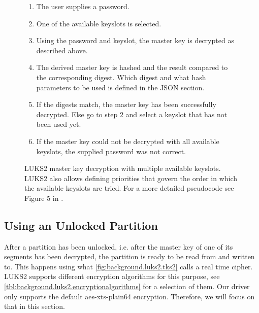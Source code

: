 \begin{figure}[htb!]
	\center
	\begin{mdframed}
		\begin{enumerate}
			\item The user supplies a password.
			\item One of the available keyslots is selected.
			\item Using the password and keyslot, the master key is decrypted as described above.
			\item The derived master key is hashed and the result compared to the corresponding digest. Which digest and what hash parameters to be used is defined in the JSON section.
			\item If the digests match, the master key has been successfully decrypted. Else go to step 2 and select a keyslot that has not been used yet.
			\item If the master key could not be decrypted with all available keyslots, the supplied password was not correct.
		\end{enumerate}
	\end{mdframed}
	\caption[
		LUKS2 master key decryption with multiple available keyslots
	]{
		LUKS2 master key decryption with multiple available keyslots. LUKS2 also allows defining priorities that govern the order in which the available keyslots are tried. For a more detailed pseudocode see Figure 5 in \cite{Fruwirth2018}.
	}
	\label{fig:background.luks2.unlocking}
\end{figure}

\subsection{Using an Unlocked Partition}
\label{chap:background.luks2.using}
After a partition has been unlocked, i.e. after the master key of one of its segments has been decrypted, the partition is ready to be read from and written to. This happens using what \autoref{fig:background.luks2.tks2} calls a real time cipher. LUKS2 supports different encryption algorithms for this purpose, see \autoref{tbl:background.luks2.encryptionalgorithms} for a selection of them. Our driver only supports the default aes-xts-plain64 encryption. Therefore, we will focus on that in this section.

